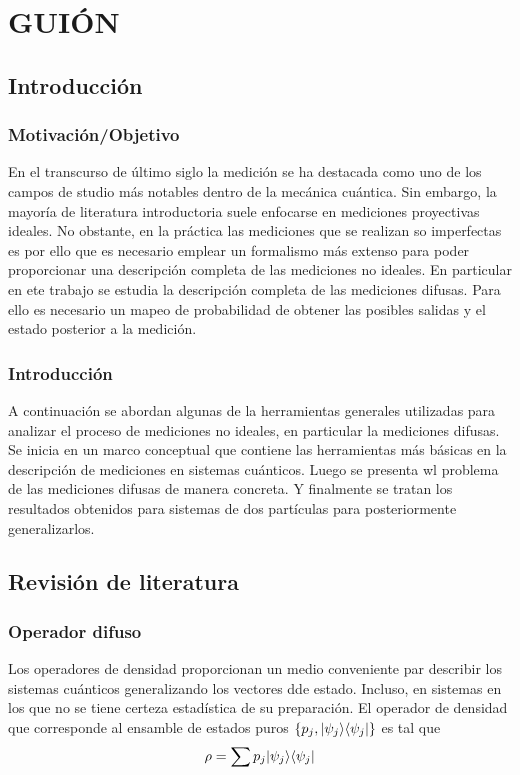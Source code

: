 \documentclass[12pt,letterpaper]{book}\raggedbottom{}
\begin{document}
\chapter{GUIÓN}
\section{Introducción}
\subsection{Motivación/Objetivo}
En el transcurso de último siglo la medición se ha destacada como uno de los campos de studio más notables dentro de la mecánica cuántica. Sin embargo, la mayoría de literatura introductoria suele enfocarse en mediciones proyectivas ideales. No obstante, en la práctica  las mediciones que se realizan so imperfectas es por ello que es necesario emplear un formalismo más extenso para poder proporcionar una descripción completa de las mediciones no ideales. En particular en ete trabajo se estudia  la descripción completa de las mediciones difusas. Para ello es necesario un mapeo de probabilidad de obtener las posibles salidas y el estado posterior a la medición.

\subsection{Introducción}
A continuación se abordan algunas de la herramientas generales utilizadas para analizar el proceso de mediciones no ideales, en particular la mediciones difusas. Se inicia en un marco conceptual que contiene las herramientas más básicas  en la descripción de mediciones en sistemas cuánticos. Luego se presenta wl problema de las mediciones difusas de manera concreta. Y finalmente se tratan los resultados obtenidos para sistemas de dos partículas para posteriormente generalizarlos.


\section{Revisión de literatura}


\subsection{Operador difuso}
Los operadores de densidad proporcionan un medio conveniente par describir los sistemas cuánticos generalizando los vectores dde estado. Incluso, en sistemas en los que no se tiene certeza estadística de su preparación. El operador de densidad que corresponde al ensamble de estados puros $ \{p_j,|\psi_j\rangle \langle\psi_j |\}$ es tal que \[\rho=\sum p_j |\psi_j\rangle \langle\psi_j|\]
\end{document}
